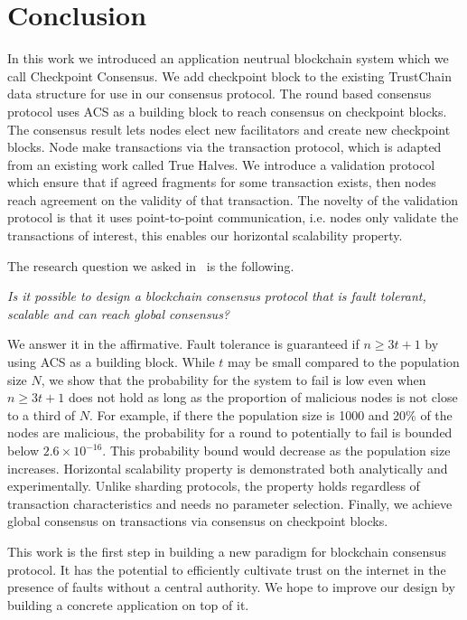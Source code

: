 \chapter{Conclusion}
\label{ch:conclusion}

In this work we introduced an application neutrual blockchain system which we call Checkpoint Consensus.
We add checkpoint block to the existing TrustChain data structure for use in our consensus protocol.
The round based consensus protocol uses ACS as a building block to reach consensus on checkpoint blocks.
The consensus result lets nodes elect new facilitators and create new checkpoint blocks.
Node make transactions via the transaction protocol,
which is adapted from an existing work called True Halves.
We introduce a validation protocol which ensure that if agreed fragments for some transaction exists,
then nodes reach agreement on the validity of that transaction.
The novelty of the validation protocol is that it uses point-to-point communication,
i.e. nodes only validate the transactions of interest,
this enables our horizontal scalability property.

The research question we asked in~ is the following.
\begin{displayquote}
\emph{Is it possible to design a blockchain consensus protocol that is fault tolerant, scalable and can reach global consensus?}
\end{displayquote}
We answer it in the affirmative.
Fault tolerance is guaranteed if $n \ge 3t + 1$ by using ACS as a building block.
While $t$ may be small compared to the population size $N$,
we show that the probability for the system to fail is low even when $n \ge 3t + 1$ does not hold as long as the proportion of malicious nodes is not close to a third of $N$.
For example, if there the population size is 1000 and 20\% of the nodes are malicious,
the probability for a round to potentially to fail is bounded below $2.6 \times 10^{-16}$.
This probability bound would decrease as the population size increases.
Horizontal scalability property is demonstrated both analytically and experimentally.
Unlike sharding protocols, the property holds regardless of transaction characteristics and needs no parameter selection.
Finally, we achieve global consensus on transactions via consensus on checkpoint blocks.

This work is the first step in building a new paradigm for blockchain consensus protocol.
It has the potential to efficiently cultivate trust on the internet in the presence of faults without a central authority.
We hope to improve our design by building a concrete application on top of it.

